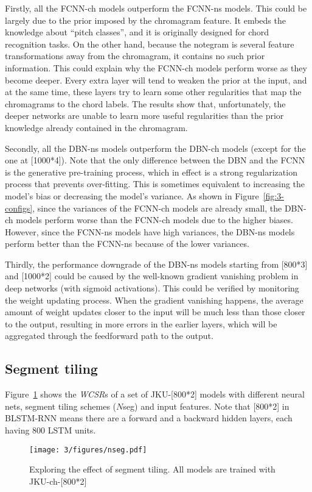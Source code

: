 Firstly, all the FCNN-ch models outperform the FCNN-ns models. This could be largely due to the prior imposed by the chromagram feature. It embeds the knowledge about ``pitch classes'', and it is originally designed for chord recognition tasks. On the other hand, because the notegram is several feature transformations away from the chromagram, it contains no such prior information. This could explain why the FCNN-ch models perform worse as they become deeper. Every extra layer will tend to weaken the prior at the input, and at the same time, these layers try to learn some other regularities that map the chromagrams to the chord labels. The results show that, unfortunately, the deeper networks are unable to learn more useful regularities than the prior knowledge already contained in the chromagram.

Secondly, all the DBN-ns models outperform the DBN-ch models (except for the one at [1000*4]). Note that the only difference between the DBN and the FCNN is the generative pre-training process, which in effect is a strong regularization process that prevents over-fitting. This is sometimes equivalent to increasing the model's bias or decreasing the model's variance. As shown in Figure~\ref{fig:3-configs}, since the variances of the FCNN-ch models are already small, the DBN-ch models perform worse than the FCNN-ch models due to the higher biases. However, since the FCNN-ns models have high variances, the DBN-ns models perform better than the FCNN-ns because of the lower variances.

Thirdly, the performance downgrade of the DBN-ns models starting from [800*3] and [1000*2] could be caused by the well-known gradient vanishing problem in deep networks (with sigmoid activations). This could be verified by monitoring the weight updating process. When the gradient vanishing happens, the average amount of weight updates closer to the input will be much less than those closer to the output, resulting in more errors in the earlier layers, which will be aggregated through the feedforward path to the output.

\subsection{Segment tiling} \label{sec:3-p3}

Figure~\ref{fig:3-nseg} shows the \textit{WCSR}s of a set of JKU-[800*2] models with different neural nets, segment tiling schemes ($N$seg) and input features. Note that [800*2] in BLSTM-RNN means there are a forward and a backward hidden layers, each having 800 LSTM units.
\begin{figure}[h!]
	\centering
	\texttt{[image: 3/figures/nseg.pdf]}
	\caption{Exploring the effect of segment tiling. All models are trained with JKU-ch-[800*2]}
	\label{fig:3-nseg}
\end{figure}

